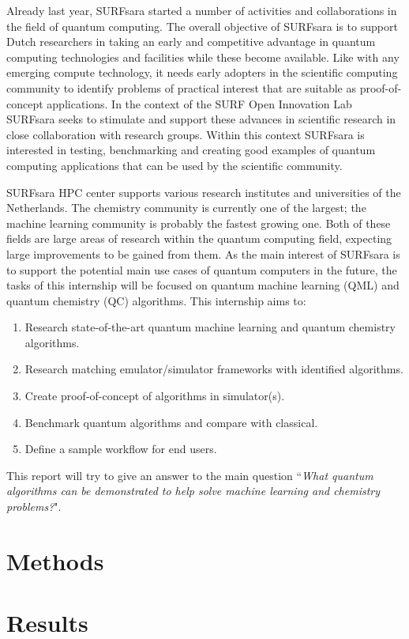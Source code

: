 \documentclass[a4paper]{article}
\begin{document}
Already last year, SURFsara started a number of activities and collaborations in the field of quantum computing.
The overall objective of SURFsara is to support Dutch researchers in taking an early and competitive advantage in quantum computing technologies and facilities while these become available.
Like with any  emerging compute technology, it needs early adopters in the scientific computing community to identify problems of practical interest that are suitable as proof-of-concept applications.
In the context of the SURF Open Innovation Lab SURFsara seeks to stimulate and support these advances in scientific research in close collaboration with research groups.
Within this context SURFsara is interested in testing, benchmarking and creating good examples of quantum computing applications that can be used by the scientific community.

SURFsara HPC center supports various research institutes and universities of the Netherlands.
The chemistry community is currently one of the largest; the machine learning community is probably the fastest growing one.
Both of these fields are large areas of research within the quantum computing field, expecting large improvements to be gained from them.
As the main interest of SURFsara is to support the potential main use cases of quantum computers in the future, the tasks of this internship will be focused on quantum machine learning (QML) and quantum chemistry (QC) algorithms.
This internship aims to:
\begin{enumerate}
	\item Research state-of-the-art quantum machine learning and quantum chemistry algorithms.
	\item Research matching emulator/simulator frameworks with identified algorithms.
	\item Create proof-of-concept of algorithms in simulator(s).
	\item Benchmark quantum algorithms and compare with classical.
	\item Define a sample workflow for end users.
\end{enumerate}

This report will try to give an answer to the main question ``\emph{What quantum algorithms can be demonstrated to help solve machine learning and chemistry problems?}".

\newpage

\section{Methods}

\section{Results}

\newpage

\printbibliography
\end{document}
